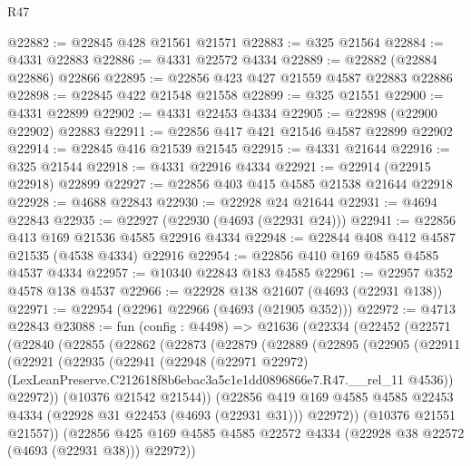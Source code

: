 \begin{lexlean}{R47}
\begin{coremodule}
@22882 := @22845 @428 @21561 @21571
@22883 := @325 @21564
@22884 := @4331 @22883
@22886 := @4331 @22572 @4334
@22889 := @22882 (@22884 @22886) @22866
@22895 := @22856 @423 @427 @21559 @4587 @22883 @22886
@22898 := @22845 @422 @21548 @21558
@22899 := @325 @21551
@22900 := @4331 @22899
@22902 := @4331 @22453 @4334
@22905 := @22898 (@22900 @22902) @22883
@22911 := @22856 @417 @421 @21546 @4587 @22899 @22902
@22914 := @22845 @416 @21539 @21545
@22915 := @4331 @21644
@22916 := @325 @21544
@22918 := @4331 @22916 @4334
@22921 := @22914 (@22915 @22918) @22899
@22927 := @22856 @403 @415 @4585 @21538 @21644 @22918
@22928 := @4688 @22843
@22930 := @22928 @24 @21644
@22931 := @4694 @22843
@22935 := @22927 (@22930 (@4693 (@22931 @24)))
@22941 := @22856 @413 @169 @21536 @4585 @22916 @4334
@22948 := @22844 @408 @412 @4587 @21535 (@4538 @4334) @22916
@22954 := @22856 @410 @169 @4585 @4585 @4537 @4334
@22957 := @10340 @22843 @183 @4585
@22961 := @22957 @352 @4578 @138 @4537
@22966 := @22928 @138 @21607 (@4693 (@22931 @138))
@22971 := @22954 (@22961 @22966 (@4693 (@21905 @352)))
@22972 := @4713 @22843
@23088 := fun (config : @4498) =>
  @21636
    (@22334
      (@22452
        (@22571
          (@22840
            (@22855
              (@22862
                (@22873
                  (@22879
                    (@22889
                      (@22895
                        (@22905
                          (@22911
                            (@22921
                              (@22935
                                (@22941
                                  (@22948
                                    (@22971 @22972)
                                    (LexLeanPreserve.C212618f8b6ebac3a5c1e1dd0896866e7.R47.__rel_11
                                      @4536))
                                  @22972))
                              (@10376 @21542 @21544))
                            (@22856
                              @419
                              @169
                              @4585
                              @4585
                              @22453
                              @4334
                              (@22928 @31 @22453 (@4693 (@22931 @31)))
                              @22972))
                          (@10376 @21551 @21557))
                        (@22856
                          @425
                          @169
                          @4585
                          @4585
                          @22572
                          @4334
                          (@22928 @38 @22572 (@4693 (@22931 @38)))
                          @22972))

\end{coremodule}
\end{lexlean}
